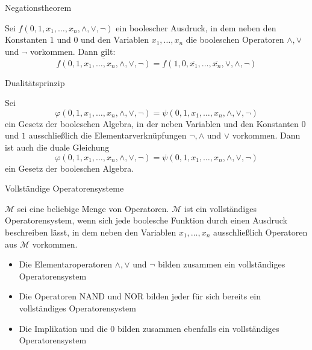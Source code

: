 \documentclass[12pt%
,aspectratio=169%
]{beamer}
\begin{document}
\begin{frame}{Negationstheorem}
\begin{theorem}[Negationstheorem]
Sei $f(0, 1, x_1 , \ldots , x_n , \land, \lor, \neg)$ ein boolescher Ausdruck, in dem neben den Konstanten $1$ und $0$ und den Variablen $x_1 ,\ldots, x_n$ die booleschen Operatoren $\land, \lor$ und $\neg$ vorkommen. Dann gilt:
$$
	\overline{f(0, 1, x_1 , \ldots , x_n , \land, \lor, \neg)} = f(1, 0, \overline{x_1}, \ldots ,\overline{x_n} ,\lor, \land, \neg)
$$
\end{theorem}
\end{frame}

\begin{frame}{Dualitätsprinzip}
\begin{theorem}
Sei
$$
\varphi(0, 1, x_1 , \ldots, x_n , \land, \lor, \neg) = \psi(0, 1, x_1 , \ldots, x_n , \land, \lor, \neg)
$$
ein Gesetz der booleschen Algebra, in der neben Variablen und den Konstanten $0$ und $1$ ausschließlich die Elementarverknüpfungen $\neg, \land$ und $\lor$ vorkommen. Dann ist auch die duale Gleichung
$$
\varphi(0, 1, x_1 , \ldots, x_n , \land, \lor, \neg) = \psi(0, 1, x_1 , \ldots, x_n , \land, \lor, \neg)
$$
ein Gesetz der booleschen Algebra.
\end{theorem}
\end{frame}

\begin{frame}{Vollständige Operatorensysteme}
\begin{definition}
$\mathcal{M}$ sei eine beliebige Menge von Operatoren. $\mathcal{M}$ ist ein vollständiges Operatorensystem, wenn sich jede boolesche Funktion durch einen Ausdruck beschreiben lässt, in dem neben den Variablen $x_1 , \ldots , x_n$ ausschließlich Operatoren aus $\mathcal{M}$ vorkommen.
\end{definition}
\begin{itemize}
	\item Die Elementaroperatoren $\land, \lor$ und $\neg$ bilden zusammen ein vollständiges Operatorensystem
	\item Die Operatoren NAND und NOR bilden jeder für sich bereits ein vollständiges Operatorensystem
	\item Die Implikation und die $0$ bilden zusammen ebenfalls ein vollständiges Operatorensystem
\end{itemize}
\end{frame}
\end{document}
